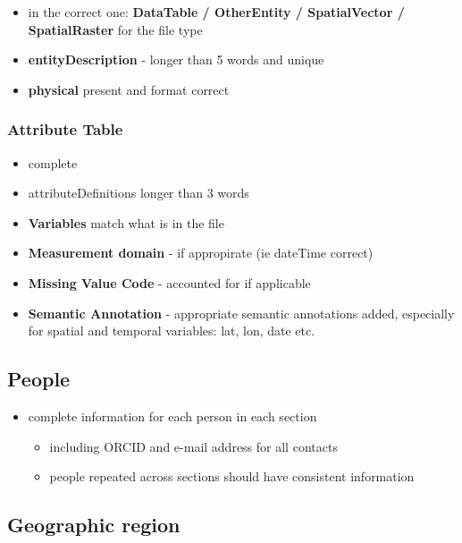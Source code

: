 \documentclass[
  letterpaper,
  DIV=11,
  numbers=noendperiod]{scrreprt}
\providecommand{\tightlist}{%
  \setlength{\itemsep}{0pt}\setlength{\parskip}{0pt}}\usepackage{longtable,booktabs,array}
\begin{document}
\begin{itemize}
\tightlist
\item
  in the correct one: \textbf{DataTable / OtherEntity / SpatialVector /
  SpatialRaster} for the file type
\item
  \textbf{entityDescription} - longer than 5 words and unique
\item
  \textbf{physical} present and format correct
\end{itemize}

\hypertarget{attribute-table}{%
\subsubsection{Attribute Table}\label{attribute-table}}

\begin{itemize}
\tightlist
\item
  complete
\item
  attributeDefinitions longer than 3 words
\item
  \textbf{Variables} match what is in the file
\item
  \textbf{Measurement domain} - if appropirate (ie dateTime correct)
\item
  \textbf{Missing Value Code} - accounted for if applicable
\item
  \textbf{Semantic Annotation} - appropriate semantic annotations added,
  especially for spatial and temporal variables: lat, lon, date etc.
\end{itemize}

\hypertarget{people}{%
\subsection{People}\label{people}}

\begin{itemize}
\tightlist
\item
  complete information for each person in each section

  \begin{itemize}
  \tightlist
  \item
    including ORCID and e-mail address for all contacts
  \item
    people repeated across sections should have consistent information
  \end{itemize}
\end{itemize}

\hypertarget{geographic-region}{%
\subsection{Geographic region}\label{geographic-region}}
\end{document}
